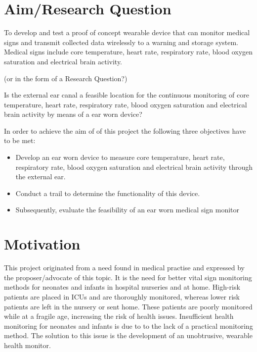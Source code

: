 \section{Aim/Research Question}
To develop and test a proof of concept wearable device that can monitor medical signs and transmit collected data wirelessly to a warning and storage system. Medical signs include core temperature, heart rate, respiratory rate, blood oxygen saturation and electrical brain activity.

\begin{center}(or in the form of a Research Question?)\end{center}

Is the external ear canal a feasible location for the continuous monitoring of core temperature, heart rate, respiratory rate, blood oxygen saturation and electrical brain activity by means of a ear worn device?

\medskip

In order to achieve the aim of of this project the following three objectives have to be met:
\begin{itemize}
\item Develop an ear worn device to measure core temperature, heart rate, respiratory rate, blood oxygen saturation and electrical brain activity through the external ear.
\item Conduct a trail to determine the functionality of this device.
\item Subsequently, evaluate the feasibility of an ear worn medical sign monitor
\end{itemize}

\section{Motivation}
This project originated from a need found in medical practise and expressed by the proposer/advocate of this topic. It is the need for better vital sign monitoring methods for neonates and infants in hospital nurseries and at home. High-risk patients are placed in ICUs and are thoroughly monitored, whereas lower risk patients are left in the nursery or sent home. These patients are poorly monitored while at a fragile age, increasing the risk of health issues. Insufficient health monitoring for neonates and infants is due to to the lack of a practical monitoring method. The solution to this issue is the development of an unobtrusive, wearable health monitor.

\medskip

